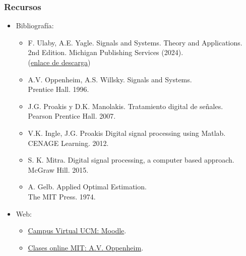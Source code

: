 \begin{frame}\frametitle{Recursos}
  \vspace{0.2cm}  
  \begin{itemize}
    \item \alert{Bibliografía:}
    \begin{itemize} \footnotesize\vspace{0.1cm}
      \item {\scriptsize F. Ulaby, A.E. Yagle.} \color{blue}Signals and Systems. Theory and Applications.\color{black}
      \\ {\scriptsize 2nd Edition. Michigan Publishing Services (2024). 
      \\ \color{blue}(\href{https://services.publishing.umich.edu/Books/S/Signals-and-Systems}{enlace de descarga})}\vspace{0.1cm}
      \item {\scriptsize A.V. Oppenheim, A.S. Willsky.} \color{blue}Signals and Systems. \color{black}\\ {\scriptsize Prentice Hall. 1996.}\vspace{0.1cm}
      \item {\scriptsize J.G. Proakis y D.K. Manolakis.} \color{blue}Tratamiento digital de señales. \color{black}\\ {\scriptsize  Pearson Prentice Hall. 2007.}\vspace{0.1cm}
      \item {\scriptsize V.K. Ingle, J.G. Proakis} \color{blue}Digital signal processing using Matlab. \color{black}\\ {\scriptsize CENAGE Learning.  2012.}\vspace{0.1cm}
      \item {\scriptsize S. K. Mitra. }\color{blue}Digital signal processing, a computer based approach. \color{black}\\ {\scriptsize McGraw Hill. 2015.}\vspace{0.1cm}
      \item {\scriptsize A. Gelb. }\color{blue}Applied Optimal Estimation. \color{black}\\ {\scriptsize The MIT Press. 1974.}\vspace{0.1cm}
    \end{itemize}

    \item \alert{Web:}
    \begin{itemize}\vspace{0.1cm}
      \item {\footnotesize \href{http://www.ucm.es/campusvirtual}{Campus Virtual UCM: Moodle}.}\vspace{0.1cm}
      \item {\footnotesize\href{http://ocw.mit.edu/resources/res-6-007-signals-and-systems-spring-2011/readings/}{Clases online MIT: A.V. Oppenheim}.}
    \end{itemize}
  \end{itemize}

\end{frame}

